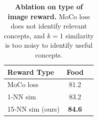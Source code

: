 

\begin{table}
    \vspace{-0.3in}
    \centering
    \begin{tabular}{lcc}
        \toprule
        Reward Type & Food \\
        \midrule
        MoCo loss & 81.2 \\
        1-NN sim  & 83.2 \\
        15-NN sim (ours) & \textbf{84.6} \\
        \bottomrule
    \end{tabular}
    \vspace{-0.06in}
    \caption{\textbf{Ablation on type of image reward.}
    MoCo loss does not identify relevant concepts, and $k=1$ similarity is too noisy to identify useful concepts. }
    \label{tab:image_reward}
    \vspace{-0.05in}
\end{table}


